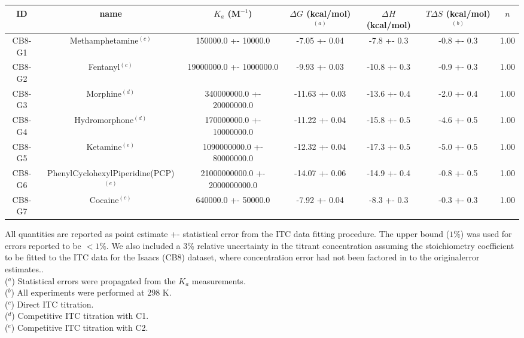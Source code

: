 \documentclass{article}
\begin{document}
\begin{center}
\footnotesize
\begin{tabu}{| c | c | c | c | c | c | c |}
\hline
\rowfont{\bfseries} ID & name & $K_a$ (M$^{-1}$) & $\Delta G$ (kcal/mol) $^{(a)}$ & $\Delta H$ (kcal/mol) & $T\Delta S$ (kcal/mol) $^{(b)}$ & $n$ \\
\hline
\hline
CB8-G1 & Methamphetamine$^{(c)}$ & 150000.0 +- 10000.0 & -7.05 +- 0.04 & -7.8 +- 0.3 & -0.8 +- 0.3 &  1.00 \\
\hline
CB8-G2 & Fentanyl$^{(c)}$ & 19000000.0 +- 1000000.0 & -9.93 +- 0.03 & -10.8 +- 0.3 & -0.9 +- 0.3 &  1.00 \\
\hline
CB8-G3 & Morphine$^{(d)}$ & 340000000.0 +- 20000000.0 & -11.63 +- 0.03 & -13.6 +- 0.4 & -2.0 +- 0.4 &  1.00 \\
\hline
CB8-G4 & Hydromorphone$^{(d)}$ & 170000000.0 +- 10000000.0 & -11.22 +- 0.04 & -15.8 +- 0.5 & -4.6 +- 0.5 &  1.00 \\
\hline
CB8-G5 & Ketamine$^{(e)}$ & 1090000000.0 +- 80000000.0 & -12.32 +- 0.04 & -17.3 +- 0.5 & -5.0 +- 0.5 &  1.00 \\
\hline
CB8-G6 & PhenylCyclohexylPiperidine(PCP)$^{(e)}$ & 21000000000.0 +- 2000000000.0 & -14.07 +- 0.06 & -14.9 +- 0.4 & -0.8 +- 0.5 &  1.00 \\
\hline
CB8-G7 & Cocaine$^{(c)}$ & 640000.0 +- 50000.0 & -7.92 +- 0.04 & -8.3 +- 0.3 & -0.3 +- 0.3 &  1.00 \\
\hline
\end{tabu}\end{center}\vspace{5mm}
All quantities are reported as point estimate +- statistical error from the ITC data fitting procedure. The upper bound ($1\%$) was used for errors reported to be $<1\%$. We also included a 3\% relative uncertainty in the titrant concentration assuming the stoichiometry coefficient to be fitted to the ITC data for the Isaacs (CB8) dataset, where concentration error had not been factored in to the originalerror estimates..\\
($^a$) Statistical errors were propagated from the $K_a$ measurements. \\
($^b$) All experiments were performed at 298 K. \\
($^c$) Direct ITC titration. \\
($^d$) Competitive ITC titration with C1. \\
($^e$) Competitive ITC titration with C2.
\end{document}
